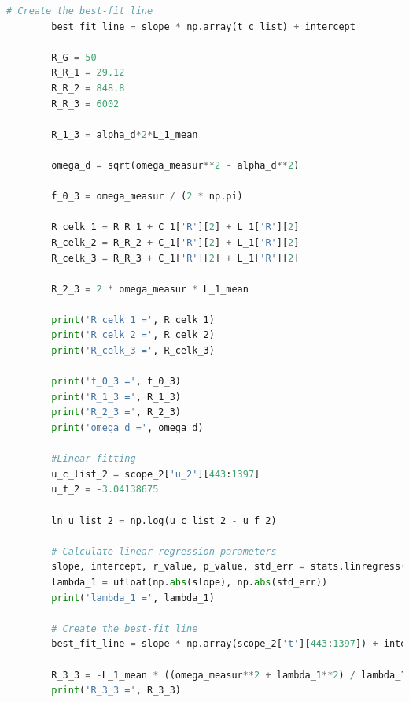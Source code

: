 \documentclass[a4paper,11pt]{article}
\begin{document}
\begin{lstlisting}[language=Python, basicstyle=\tiny, breaklines=true]
        # Create the best-fit line
        best_fit_line = slope * np.array(t_c_list) + intercept

        R_G = 50
        R_R_1 = 29.12
        R_R_2 = 848.8
        R_R_3 = 6002
        
        R_1_3 = alpha_d*2*L_1_mean
        
        omega_d = sqrt(omega_measur**2 - alpha_d**2)
        
        f_0_3 = omega_measur / (2 * np.pi)
        
        R_celk_1 = R_R_1 + C_1['R'][2] + L_1['R'][2]
        R_celk_2 = R_R_2 + C_1['R'][2] + L_1['R'][2]
        R_celk_3 = R_R_3 + C_1['R'][2] + L_1['R'][2]
        
        R_2_3 = 2 * omega_measur * L_1_mean
        
        print('R_celk_1 =', R_celk_1)
        print('R_celk_2 =', R_celk_2)
        print('R_celk_3 =', R_celk_3)
        
        print('f_0_3 =', f_0_3)
        print('R_1_3 =', R_1_3)
        print('R_2_3 =', R_2_3)
        print('omega_d =', omega_d)

        #Linear fitting
        u_c_list_2 = scope_2['u_2'][443:1397]
        u_f_2 = -3.04138675
        
        ln_u_list_2 = np.log(u_c_list_2 - u_f_2)
        
        # Calculate linear regression parameters
        slope, intercept, r_value, p_value, std_err = stats.linregress(scope_2['t'][443:1397], ln_u_list_2)
        lambda_1 = ufloat(np.abs(slope), np.abs(std_err))
        print('lambda_1 =', lambda_1)
        
        # Create the best-fit line
        best_fit_line = slope * np.array(scope_2['t'][443:1397]) + intercept

        R_3_3 = -L_1_mean * ((omega_measur**2 + lambda_1**2) / lambda_1) 
        print('R_3_3 =', R_3_3)
    \end{lstlisting} 
\end{document}

